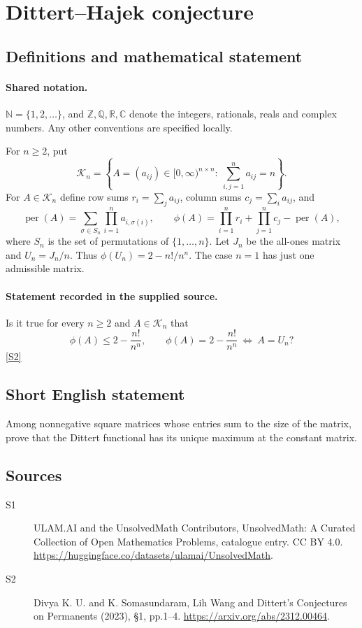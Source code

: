 \documentclass[11pt]{article}
\newcommand{\sref}[2]{\hyperlink{source:#1:#2}{[S#2]}}
\begin{document}
\section{Dittert–Hajek conjecture}\label{statement}

\subsection{Definitions and mathematical statement}

\paragraph{Shared notation.}$\mathbb N=\{1,2,\ldots\}$, and $\mathbb Z,\mathbb Q,\mathbb R,\mathbb C$ denote the integers, rationals, reals and complex numbers. Any other conventions are specified locally.


For $n\ge2$, put
\[
\mathcal K_n=\left\{A=(a_{ij})\in[0,\infty)^{n\times n}:\ \sum_{i,j=1}^{n}a_{ij}=n\right\}.
\]
For $A\in\mathcal K_n$ define row sums $r_i=\sum_j a_{ij}$, column sums $c_j=\sum_i a_{ij}$, and
\[
\operatorname{per}(A)=\sum_{\sigma\in S_n}\prod_{i=1}^{n}a_{i,\sigma(i)},\qquad
\phi(A)=\prod_{i=1}^{n}r_i+\prod_{j=1}^{n}c_j-\operatorname{per}(A),
\]
where $S_n$ is the set of permutations of $\{1,\ldots,n\}$. Let $J_n$ be the all-ones matrix and $U_n=J_n/n$. Thus $\phi(U_n)=2-n!/n^n$. The case $n=1$ has just one admissible matrix.
\paragraph{Statement recorded in the supplied source.}
Is it true for every $n\ge2$ and $A\in\mathcal K_n$ that
\[
\phi(A)\le 2-\frac{n!}{n^n},\qquad
\phi(A)=2-\frac{n!}{n^n}\ \Longleftrightarrow\ A=U_n?
\] \sref{statement}{2}
\subsection{Short English statement}
Among nonnegative square matrices whose entries sum to the size of the matrix, prove that the Dittert functional has its unique maximum at the constant matrix.
\subsection{Sources}
\begin{description}
\item[\hypertarget{source:statement:1}{S1}] ULAM.AI and the UnsolvedMath Contributors, UnsolvedMath: A Curated Collection of Open Mathematics Problems, catalogue entry. CC BY 4.0. \url{https://huggingface.co/datasets/ulamai/UnsolvedMath}.
\item[\hypertarget{source:statement:2}{S2}] Divya K. U. and K. Somasundaram, Lih Wang and Dittert’s Conjectures on Permanents (2023), §1, pp.1–4. \url{https://arxiv.org/abs/2312.00464}.
\end{description}
\label{end:statement}
\end{document}
